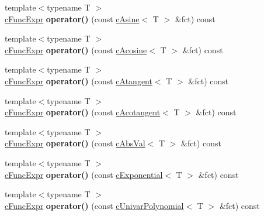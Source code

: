 \begin{DoxyCompactItemize}
\item 
\hypertarget{classcDiffVisitor_a196a44288cf21541ff02d04acabb8cbf}{{\footnotesize template$<$typename T $>$ }\\\hyperlink{classcFuncExpr}{c\-Func\-Expr} {\bfseries operator()} (const \hyperlink{classcAsine}{c\-Asine}$<$ T $>$ \&fct) const }\label{classcDiffVisitor_a196a44288cf21541ff02d04acabb8cbf}

\item 
\hypertarget{classcDiffVisitor_a549f558b5039c613d65819d3abf01f0f}{{\footnotesize template$<$typename T $>$ }\\\hyperlink{classcFuncExpr}{c\-Func\-Expr} {\bfseries operator()} (const \hyperlink{classcAcosine}{c\-Acosine}$<$ T $>$ \&fct) const }\label{classcDiffVisitor_a549f558b5039c613d65819d3abf01f0f}

\item 
\hypertarget{classcDiffVisitor_aa5cd175cf7d1e623fcb440662a1a4c99}{{\footnotesize template$<$typename T $>$ }\\\hyperlink{classcFuncExpr}{c\-Func\-Expr} {\bfseries operator()} (const \hyperlink{classcAtangent}{c\-Atangent}$<$ T $>$ \&fct) const }\label{classcDiffVisitor_aa5cd175cf7d1e623fcb440662a1a4c99}

\item 
\hypertarget{classcDiffVisitor_aaeb28648bbdb0da442236078e02a0ce5}{{\footnotesize template$<$typename T $>$ }\\\hyperlink{classcFuncExpr}{c\-Func\-Expr} {\bfseries operator()} (const \hyperlink{classcAcotangent}{c\-Acotangent}$<$ T $>$ \&fct) const }\label{classcDiffVisitor_aaeb28648bbdb0da442236078e02a0ce5}

\item 
\hypertarget{classcDiffVisitor_a9ad7bab0c584e3179fa4a27bdb212c34}{{\footnotesize template$<$typename T $>$ }\\\hyperlink{classcFuncExpr}{c\-Func\-Expr} {\bfseries operator()} (const \hyperlink{classcAbsVal}{c\-Abs\-Val}$<$ T $>$ \&fct) const }\label{classcDiffVisitor_a9ad7bab0c584e3179fa4a27bdb212c34}

\item 
\hypertarget{classcDiffVisitor_a93d2308dd5bf5148939b51da4129d5f1}{{\footnotesize template$<$typename T $>$ }\\\hyperlink{classcFuncExpr}{c\-Func\-Expr} {\bfseries operator()} (const \hyperlink{classcExponential}{c\-Exponential}$<$ T $>$ \&fct) const }\label{classcDiffVisitor_a93d2308dd5bf5148939b51da4129d5f1}

\item 
\hypertarget{classcDiffVisitor_a38a566489c5fd481de508f795b4b4e68}{{\footnotesize template$<$typename T $>$ }\\\hyperlink{classcFuncExpr}{c\-Func\-Expr} {\bfseries operator()} (const \hyperlink{classcUnivarPolynomial}{c\-Univar\-Polynomial}$<$ T $>$ \&fct) const }\label{classcDiffVisitor_a38a566489c5fd481de508f795b4b4e68}


\end{DoxyCompactItemize}
